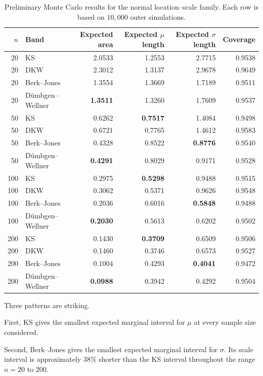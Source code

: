 \documentclass[11pt]{article}
\begin{document}
\begin{table}[htbp]
\centering
\small
\caption{
Preliminary Monte Carlo results for the normal location--scale family.
Each row is based on $10{,}000$ outer simulations.
}
\label{tab:normal}
\begin{tabular}{
    r
    l
    r
    r
    r
    r
}
\toprule
$n$
&
Band
&
Expected area
&
Expected $\mu$ length
&
Expected $\sigma$ length
&
Coverage
\\
\midrule
20
& KS
& 2.0533
& 1.2553
& 2.7715
& 0.9538
\\
20
& DKW
& 2.3012
& 1.3137
& 2.9678
& 0.9649
\\
20
& Berk--Jones
& 1.3554
& 1.3669
& 1.7189
& 0.9511
\\
20
& Dümbgen--Wellner
& \textbf{1.3511}
& 1.3260
& 1.7609
& 0.9537
\\
\addlinespace

50
& KS
& 0.6262
& \textbf{0.7517}
& 1.4084
& 0.9498
\\
50
& DKW
& 0.6721
& 0.7765
& 1.4612
& 0.9583
\\
50
& Berk--Jones
& 0.4328
& 0.8522
& \textbf{0.8776}
& 0.9540
\\
50
& Dümbgen--Wellner
& \textbf{0.4291}
& 0.8029
& 0.9171
& 0.9528
\\
\addlinespace

100
& KS
& 0.2975
& \textbf{0.5298}
& 0.9488
& 0.9515
\\
100
& DKW
& 0.3062
& 0.5371
& 0.9626
& 0.9548
\\
100
& Berk--Jones
& 0.2036
& 0.6016
& \textbf{0.5848}
& 0.9488
\\
100
& Dümbgen--Wellner
& \textbf{0.2030}
& 0.5613
& 0.6202
& 0.9502
\\
\addlinespace

200
& KS
& 0.1430
& \textbf{0.3709}
& 0.6509
& 0.9506
\\
200
& DKW
& 0.1460
& 0.3746
& 0.6573
& 0.9527
\\
200
& Berk--Jones
& 0.1004
& 0.4293
& \textbf{0.4041}
& 0.9472
\\
200
& Dümbgen--Wellner
& \textbf{0.0988}
& 0.3942
& 0.4292
& 0.9504
\\
\bottomrule
\end{tabular}
\end{table}

Three patterns are striking.

First, KS gives the smallest expected marginal interval for $\mu$ at
every sample size considered.

Second, Berk--Jones gives the smallest expected marginal interval for
$\sigma$.  Its scale interval is approximately $38\%$ shorter than the
KS interval throughout the range $n=20$ to $200$.
\end{document}
